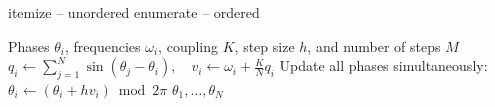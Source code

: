 itemize -- unordered
enumerate -- ordered 



\begin{algorithm}[ht]
    \caption{Simulate the Kuramoto model}
    \begin{algorithmic}[1]
        \Require Phases $\theta_i$, frequencies $\omega_i$, coupling $K$, step
                 size $h$, and number of steps $M$
                \State $q_i \gets \displaystyle\sum_{j=1}^{N}\sin(\theta_j-\theta_i),
                        \quad v_i \gets \omega_i + \frac{K}{N} q_i$
            \EndFor
            \State Update all phases simultaneously:
                   $\theta_i \gets (\theta_i + h v_i) \bmod 2\pi$
        \EndFor
        \State \Return $\theta_1,\dots,\theta_N$
    \end{algorithmic}
\end{algorithm}